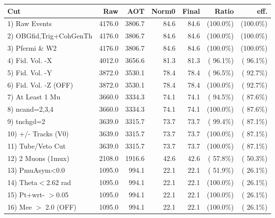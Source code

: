  \begin{table}[h!]\centering
 \begin{tabular}{||l||r|r|r|r|r|r||}
 \hline
 \hline
 Cut & Raw & AOT & Norm0 & Final & Ratio & eff.       \\
 \hline
  1) Raw Events           &       4176.0 &       3806.7 &         84.6 &         84.6 & (100.0\%) & (100.0\%) \\
  2) OBGfid,Trig+CohGenTh &       4176.0 &       3806.7 &         84.6 &         84.6 & (100.0\%) & (100.0\%) \\
  3) Pfermi \& W2         &       4176.0 &       3806.7 &         84.6 &         84.6 & (100.0\%) & (100.0\%) \\
  4) Fid. Vol. -X         &       4012.0 &       3656.6 &         81.3 &         81.3 & ( 96.1\%) & ( 96.1\%) \\
  5) Fid. Vol. -Y         &       3872.0 &       3530.1 &         78.4 &         78.4 & ( 96.5\%) & ( 92.7\%) \\
  6) Fid. Vol. -Z (OFF)   &       3872.0 &       3530.1 &         78.4 &         78.4 & (100.0\%) & ( 92.7\%) \\
  7) At Least 1 Mu        &       3660.0 &       3334.3 &         74.1 &         74.1 & ( 94.5\%) & ( 87.6\%) \\
  8) ncand=2,3,4          &       3660.0 &       3334.3 &         74.1 &         74.1 & (100.0\%) & ( 87.6\%) \\
  9) tnchgd=2             &       3639.0 &       3315.7 &         73.7 &         73.7 & ( 99.4\%) & ( 87.1\%) \\
 10) +/- Tracks (V0)      &       3639.0 &       3315.7 &         73.7 &         73.7 & (100.0\%) & ( 87.1\%) \\
 11) Tube/Veto Cut        &       3639.0 &       3315.7 &         73.7 &         73.7 & (100.0\%) & ( 87.1\%) \\
 12) 2 Muons (1mux)       &       2108.0 &       1916.6 &         42.6 &         42.6 & ( 57.8\%) & ( 50.3\%) \\
 13) PmuAsym<0.0          &       1095.0 &        994.1 &         22.1 &         22.1 & ( 51.9\%) & ( 26.1\%) \\
 14) Theta$<$2.62 rad     &       1095.0 &        994.1 &         22.1 &         22.1 & (100.0\%) & ( 26.1\%) \\
 15) Pt+wrt- $>$0.05      &       1095.0 &        994.1 &         22.1 &         22.1 & (100.0\%) & ( 26.1\%) \\
 16) Mee $>$ 2.0  (OFF)   &       1095.0 &        994.1 &         22.1 &         22.1 & (100.0\%) & ( 26.1\%) \\

\end{tabular}
\end{table}
